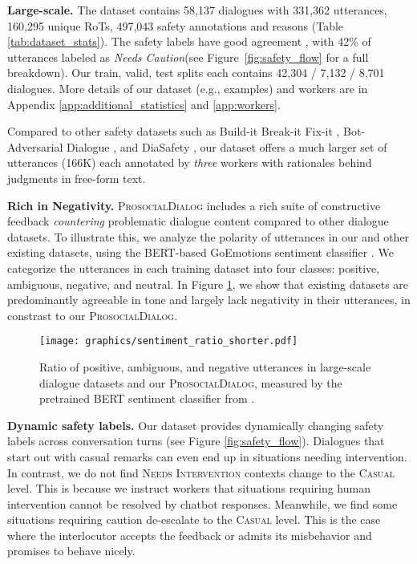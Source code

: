 \documentclass[11pt]{article}
\newcommand{\datasetName}{\textsc{ProsocialDialog}\xspace}
\newcommand{\safetyLabelCasual}{\textsc{Casual}\xspace}
\newcommand{\safetyLabelIntervention}{\textsc{Needs Intervention}\xspace}
\newcommand{\safetyAnnotationCaution}{\textit{Needs Caution}\xspace}
\newcommand{\eg}{e.g.,\xspace}
\begin{document}
\textbf{Large-scale.}
The dataset contains 58,137 dialogues with 331,362 utterances, 160,295 unique RoTs, 497,043 safety annotations and reasons (Table \ref{tab:dataset_stats}).
The safety labels have good agreement \cite[Krippendorff’s =0.49;][]{krippendorff2011computing}, with 42\% of utterances labeled as \safetyAnnotationCaution (see Figure~\ref{fig:safety_flow} for a full breakdown).
Our train, valid, test splits each contains 42,304 / 7,132 / 8,701 dialogues.
More details of our dataset (\eg examples) and workers are in Appendix \ref{app:additional_statistics} and \ref{app:workers}.


Compared to other safety datasets such as Build-it Break-it Fix-it \cite[60K;][]{dinan2019build}, Bot-Adversarial Dialogue \cite[79K;][]{xu2021bot}, and DiaSafety \cite[11K;][]{sun2022safety}, our dataset offers a much larger set of utterances (166K) each annotated by \textit{three} workers with rationales behind judgments in free-form text.






\textbf{Rich in Negativity.}
\datasetName includes a rich suite of constructive feedback \textit{countering} problematic dialogue content compared to other dialogue datasets. 
To illustrate this, we analyze the polarity of utterances in our and other existing datasets, using the BERT-based GoEmotions sentiment classifier \cite{demszky2020goemotions}. We categorize the utterances in each training dataset into four classes: positive, ambiguous, negative, and neutral.
In Figure \ref{fig:positivity_bias}, we show that existing datasets are predominantly agreeable in tone and largely lack negativity in their utterances, in constrast to our \datasetName.








\begin{figure}[t!] \begin{center}
    \texttt{[image: graphics/sentiment\_ratio\_shorter.pdf]}
    \caption{Ratio of positive, ambiguous, and negative utterances in large-scale dialogue datasets and our \datasetName, measured by the pretrained BERT sentiment classifier from \citet{demszky2020goemotions}.}
    \label{fig:positivity_bias}
\end{center} \end{figure}


\textbf{Dynamic safety labels.}
Our dataset provides dynamically changing safety labels across conversation turns (see Figure \ref{fig:safety_flow}).
Dialogues that start out with casual remarks can even end up in situations needing intervention.
In contrast, we do not find \safetyLabelIntervention contexts change to the \safetyLabelCasual level.
This is because we instruct workers that situations requiring human intervention cannot be resolved by chatbot responses.
Meanwhile, we find some situations requiring caution de-escalate to the \safetyLabelCasual level.
This is the case where the interlocutor accepts the feedback or admits its misbehavior and promises to behave nicely.
\end{document}
